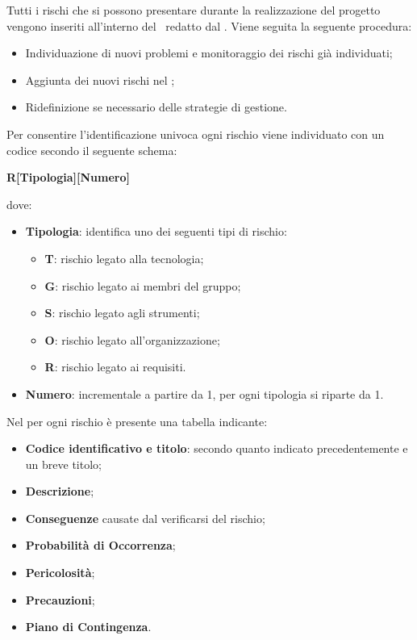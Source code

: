 \label{GestioneRischi}
Tutti i rischi che si possono presentare durante la realizzazione del progetto vengono inseriti all'interno del \PdPv\ redatto dal \Responsabile.
Viene seguita la seguente procedura:
\begin{itemize}
	\item Individuazione di nuovi problemi e monitoraggio dei rischi già individuati;
	\item Aggiunta dei nuovi rischi nel \PdPv;
	\item Ridefinizione se necessario delle strategie di gestione.
\end{itemize}
Per consentire l'identificazione univoca ogni rischio viene individuato con un codice secondo il seguente schema:
\begin{center}
	\textbf{R[Tipologia][Numero]}
\end{center}
dove: 
\begin{itemize}
	\item \textbf{Tipologia}: identifica uno dei seguenti tipi di rischio:
		\begin{itemize}
			\item \textbf{T}: rischio legato alla tecnologia;
			\item \textbf{G}: rischio legato ai membri del gruppo;
			\item \textbf{S}: rischio legato agli strumenti;
			\item \textbf{O}: rischio legato all'organizzazione;
			\item \textbf{R}: rischio legato ai requisiti.
		\end{itemize}
	\item \textbf{Numero}: incrementale a partire da 1, per ogni tipologia si riparte da 1.
\end{itemize}
Nel   per ogni rischio è presente una tabella indicante:
\begin{itemize}
	\item \textbf{Codice identificativo e titolo}: secondo quanto indicato precedentemente e un breve titolo;
	\item \textbf{Descrizione};
	\item \textbf{Conseguenze} causate dal verificarsi del rischio;
	\item \textbf{Probabilità di Occorrenza};
	\item \textbf{Pericolosità};
	\item \textbf{Precauzioni};
	\item \textbf{Piano di Contingenza}.
\end{itemize}


